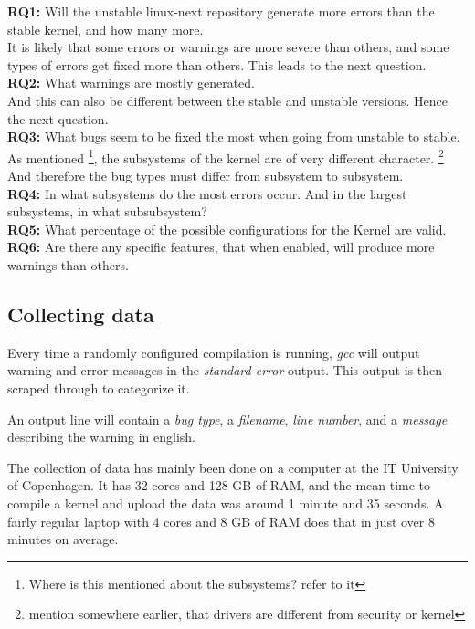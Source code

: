 \documentclass[a4paper,11pt]{article}
\begin{document}
\textbf{RQ1:} Will the unstable linux-next repository generate more errors than the 
stable kernel, and how many more. \\


It is likely that some errors or warnings are more severe than others, and some 
types of errors get fixed more than others. This leads to the next question.\\


\textbf{RQ2:} What warnings are mostly generated.  \\


And this can also be different between the stable and unstable versions. Hence 
the next question. \\


\textbf{RQ3:} What bugs seem to be fixed the most when going from unstable to 
stable. \\


As mentioned \footnote{Where is this mentioned about the subsystems? refer to 
it}, the subsystems of the kernel are of very different character. 
\footnote{mention somewhere earlier, that drivers are different from security 
or kernel} And therefore the bug types must differ from subsystem to subsystem. 
\\


\textbf{RQ4:} In what subsystems do the most errors occur. And in the largest 
subsystems, in what subsubsystem? \\


\textbf{RQ5:} What percentage of the possible configurations for the Kernel are 
valid. \\


\textbf{RQ6:} Are there any specific features, that when enabled, will produce 
more warnings than others. \\




\subsection{Collecting data}

Every time a randomly configured compilation is running, \emph{gcc} will 
output warning and error messages in the \emph{standard error} output. This 
output is then scraped through to categorize it.

An output line will contain a \emph{bug type}, a \emph{filename}, \emph{line 
number}, and a \emph{message} describing the warning in english.


The collection of data has mainly been done on a computer at the IT University 
of Copenhagen. It has 32 cores and 128 GB of RAM, and the mean time to compile 
a kernel and upload the data was around 1 minute and 35 seconds. A fairly 
regular laptop with 4 cores and 8 GB of RAM does that in just over 8 minutes 
on average. \\
\end{document}
